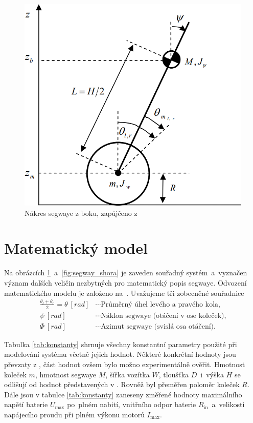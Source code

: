\documentclass[conference]{IEEEtran}
\begin{document}
\begin{figure}[htbp]
    \centerline{\includegraphics[width=0.9\linewidth]{segway_bok.png}}
    \caption{Nákres segwaye z boku, zapůjčeno z \cite{model_based_design}}
    \label{fig:segway_bok}        
\end{figure}

\section{Matematický model}
Na obrázcích \ref{fig:segway_bok}~a~\ref{fig:segway_shora} je zaveden souřadný systém~a~vyznačen význam dalších veličin
nezbytných pro matematický popis segwaye. Odvození matematického modelu je založeno na~\cite{model_based_design}.
Uvažujeme tři zobecněné souřadnice
\begin{equation*}
    \begin{aligned}
        \frac{\theta_l + \theta_r}{2} = \theta~ [\si{rad}] &\cdots \text{Průměrný úhel levého~a~pravého kola,} \\
        \psi ~[\si{rad}] &\cdots \text{Náklon segwaye (otáčení v ose koleček),} \\
        \varPhi~[\si{rad}] &\cdots \text{Azimut segwaye (svislá osa otáčení).}
    \end{aligned}
\end{equation*}



Tabulka \ref{tab:konstanty} shrnuje všechny konstantní parametry použité při modelování systému včetně jejich hodnot.
Některé konkrétní hodnoty jsou převzaty z \cite{model_based_design}, část hodnot ovšem bylo možno experimentálně ověřit.
Hmotnost koleček $m$, hmotnost segwaye $M$, šířka vozítka $W$, tloušťka $D$~i~výška $H$ se odlišují od hodnot
představených v \cite{model_based_design}. Rovněž byl přeměřen poloměr koleček $R$.
Dále jsou v tabulce \ref{tab:konstanty} zaneseny změřené hodnoty maximálního napětí baterie $U_\text{max}$ po~plném nabití,
vnitřního odpor baterie $R_\text{in}$~a~velikosti napájecího proudu při plném výkonu motorů $I_\text{max}$.
\end{document}
